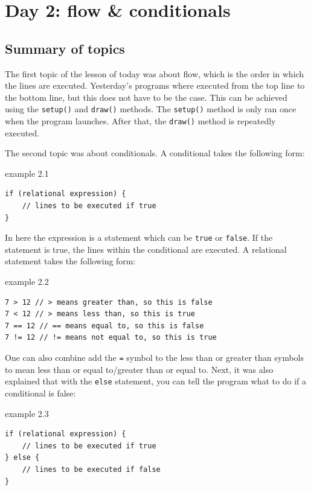 \chapter{Day 2: flow \& conditionals}

\section{Summary of topics}
The first topic of the lesson of today was about flow, which is the order in which the lines are executed. Yesterday's programs where executed from the top line to the bottom line, but this does not have to be the case. This can be achieved using the \texttt{setup()} and \texttt{draw()} methods. The \texttt{setup()} method is only ran once when the program launches. After that, the \texttt{draw()} method is repeatedly executed.

The second topic was about conditionals. A conditional takes the following form:

\begin{codebox}{example 2.1}
    \begin{lstlisting}
if (relational expression) {
    // lines to be executed if true
}
    \end{lstlisting}
\end{codebox}

In here the expression is a statement which can be \texttt{true} or \texttt{false}. If the statement is true, the lines within the conditional are executed. A relational statement takes the following form:

\begin{codebox}{example 2.2}
    \begin{lstlisting}
7 > 12 // > means greater than, so this is false
7 < 12 // > means less than, so this is true
7 == 12 // == means equal to, so this is false
7 != 12 // != means not equal to, so this is true
    \end{lstlisting}
\end{codebox}

One can also combine add the \texttt{=} symbol to the less than or greater than symbols to mean less than or equal to/greater than or equal to. Next, it was also explained that with the \texttt{else} statement, you can tell the program what to do if a conditional is false:

\begin{codebox}{example 2.3}
    \begin{lstlisting}
if (relational expression) {
    // lines to be executed if true
} else {
    // lines to be executed if false
}
    \end{lstlisting}
\end{codebox}

